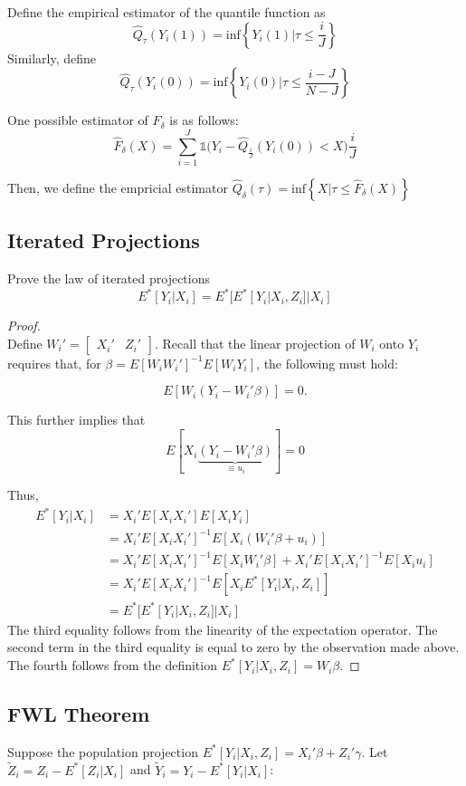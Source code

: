 \documentclass[11pt]{article}
\begin{document}
\begin{enumerate}[a)]
	Define the empirical estimator of the quantile function as
	$$\hat Q_{\tau}(Y_i(1)) = \text{inf}\left\{ Y_i(1) | \tau \leq \frac{i}{J} \right\}$$Similarly, define
	$$\hat Q_{\tau}(Y_i(0)) = \text{inf}\left\{ Y_i(0) | \tau \leq \frac{i-J}{N-J} \right\}$$

	One possible estimator of $F_\delta$ is as follows:
	$$\hat F_\delta (X) = \sum_{i=1}^J \mathbb{1}\big(Y_i -  \hat Q_{\frac{i}{J}}(Y_i(0)) < X\big)\frac{i}{J}$$

	Then, we define the empricial estimator $\hat Q_{\delta}(\tau) = \text{inf}\left\{ X |\tau \leq \hat F_\delta (X)\right\}$
\end{enumerate}


\subsection*{Iterated Projections}
Prove the law of iterated projections 
$$E^*[Y_i|X_i] = E^*[E^*[Y_i|X_i,Z_i]|X_i]$$

\begin{proof}\mbox{}\\
	Define $W_i' = \begin{bmatrix}X_i' & Z_i'\end{bmatrix}$. Recall that the linear projection of $W_i$ onto $Y_i$ requires that, for $\beta = E[W_i W_i']^{-1}E[W_i Y_i]$, the following must hold:

	$$E[W_i(Y_i - W_i'\beta)] = 0.$$

	This further implies that $$E[X_i\underbrace{(Y_i - W_i'\beta)}_{\equiv u_i}] = 0$$

	Thus,
	\begin{align*}
		E^*[Y_i|X_i] & = X_i'E[X_iX_i']E[X_iY_i] \\
		& = X_i'E[X_iX_i']^{-1}E[X_i(W_i'\beta + u_i)] \\
		& = X_i'E[X_iX_i']^{-1}E[X_i W_i'\beta] + X_i'E[X_iX_i']^{-1}E[X_i u_i] \\
		& = X_i'E[X_iX_i']^{-1}E[X_i E^*[Y_i|X_i,Z_i]] \\
		& = E^*[E^*[Y_i|X_i,Z_i]|X_i]
	\end{align*}
	The third equality follows from the linearity of the expectation operator. The second term in the third equality is equal to zero by the observation made above. The fourth follows from the definition $E^*[Y_i|X_i,Z_i] = W_i\beta$.
	\end{proof}

\subsection*{FWL Theorem}
Suppose the population projection $E^*[Y_i|X_i,Z_i] = X_i'\beta + Z_i'\gamma$. Let $\tilde Z_i = Z_i - E^*[Z_i|X_i]$ and $\tilde Y_i = Y_i - E^*[Y_i|X_i]$:
\end{document}
